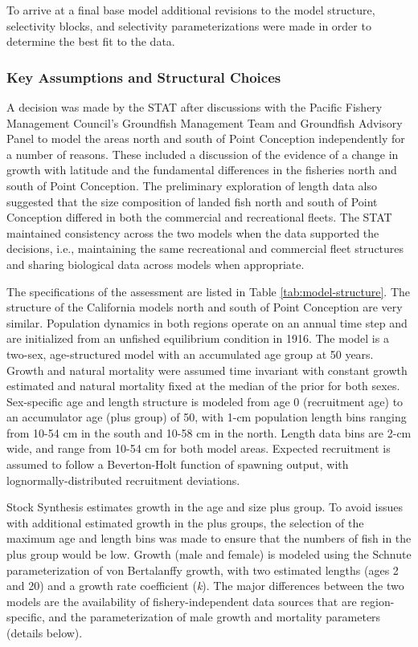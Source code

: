 \documentclass[11pt,
  english,
  letterpaper,
]{article}
\begin{document}
To arrive at a final base model additional revisions to the model structure, selectivity blocks, and selectivity parameterizations were made in order to determine the best fit to the data.

\hypertarget{key-assumptions-and-structural-choices}{%
\subsubsection{Key Assumptions and Structural Choices}\label{key-assumptions-and-structural-choices}}

A decision was made by the STAT after discussions with the Pacific Fishery Management Council's Groundfish Management Team and Groundfish Advisory Panel to model the areas north and south of Point Conception independently for a number of reasons. These included a discussion of the evidence of a change in growth with latitude and the fundamental differences in the fisheries north and south of Point Conception. The preliminary exploration of length data also suggested that the size composition of landed fish north and south of Point Conception differed in both the commercial and recreational fleets. The STAT maintained consistency across the two models when the data supported the decisions, i.e., maintaining the same recreational and commercial fleet structures and sharing biological data across models when appropriate.

The specifications of the assessment are listed in Table \ref{tab:model-structure}. The structure of the California models north and south of Point Conception are very similar. Population dynamics in both regions operate on an annual time step and are initialized from an unfished equilibrium condition in 1916. The model is a two-sex, age-structured model with an accumulated age group at 50 years. Growth and natural mortality were assumed time invariant with constant growth estimated and natural mortality fixed at the median of the prior for both sexes. Sex-specific age and length structure is modeled from age 0 (recruitment age) to an accumulator age (plus group) of 50, with 1-cm population length bins ranging from 10-54 cm in the south and 10-58 cm in the north. Length data bins are 2-cm wide, and range from 10-54 cm for both model areas. Expected recruitment is assumed to follow a Beverton-Holt function of spawning output, with lognormally-distributed recruitment deviations.

Stock Synthesis estimates growth in the age and size plus group. To avoid issues with additional estimated growth in the plus groups, the selection of the maximum age and length bins was made to ensure that the numbers of fish in the plus group would be low. Growth (male and female) is modeled using the Schnute parameterization of von Bertalanffy growth, with two estimated lengths (ages 2 and 20) and a growth rate coefficient (\emph{k}). The major differences between the two models are the availability of fishery-independent data sources that are region-specific, and the parameterization of male growth and mortality parameters (details below).
\end{document}
